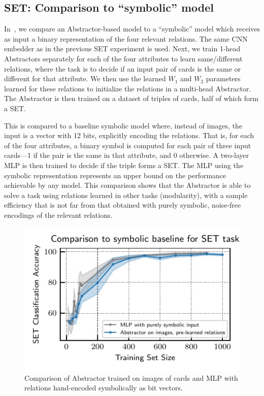 \subsection{SET: Comparison to ``symbolic'' model}
In~, we compare an Abstractor-based model to a ``symbolic'' model which receives as input a binary representation of the four relevant relations. The same CNN embedder as in the previous SET experiment is used. Next, we train 1-head Abstractors separately for each of the four attributes to learn same/different relations, where the task is to decide if an input pair of cards is the same or different for that attribute. We then use the learned $W_1$ and $W_2$ parameters learned for these relations to initialize the relations in a multi-head Abstractor. The Abstractor is then trained on a dataset of triples of cards, half of which form a SET.

This is compared to a baseline symbolic model where, instead of images, the input is a vector with 12 bits,
explicitly encoding the relations. That is, for each of the four attributes, a binary symbol is computed for each pair of three input cards---1 if the pair is the same in that attribute, and 0 otherwise. A two-layer MLP is then trained to decide if the triple forms a SET. The MLP using the symbolic representation represents an upper bound on the performance achievable by any model. This comparison shows that the Abstractor is able to solve a task using relations learned in other tasks (modularity), with a sample efficiency that is not far from that obtained with purely symbolic, noise-free encodings of the relevant relations.

\begin{figure}[ht]
    \centering

    \includegraphics{figures/experiments/set_symbolic_vs_abstractor.pdf}
    \caption{Comparison of Abstractor trained on images of cards and MLP with relations hand-encoded symbolically as bit vectors.}%
    \label{fig:exp_set_symbolic}
\end{figure}